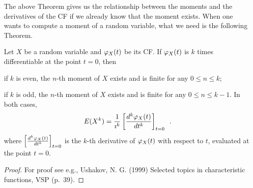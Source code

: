 The above Theorem gives us the relationship between the moments and the derivatives of the CF if we already know that the moment exists.  
When one wants to compute a moment of a random variable, what we need is the following Theorem.

\begin{framed}
\begin{prop}
Let $X$ be a random variable and $\varphi_X(t)$ be its CF.  
If $\varphi_X(t)$ is $k$ times differentiable at the point $t=0$, then
\be
\item if $k$ is even, the $n$-th moment of $X$ exists and is finite for any $0 \leq n \leq k$;
\item if $k$ is odd, the $n$-th moment of $X$ exists and is finite for any $0 \leq n \leq k-1$.
\ee
In both cases,
\begin{equation}\label{E:CFToMoments}
E(X^k) = \frac{1}{\imath^k} \left[\frac{d^k \varphi_X(t)}{dt^k}\right]_{t=0} \enspace .
\end{equation}
where $\left[\frac{d^k \varphi_X(t)}{dt^k}\right]_{t=0}$ is the $k$-th derivative of $\varphi_X(t)$ with respect to $t$, evaluated at the point $t=0$.
\end{prop}
\end{framed}

\begin{proof}
For proof see e.g., Ushakov, N. G. (1999) Selected topics in characteristic functions, VSP (p.~39).
\end{proof}



